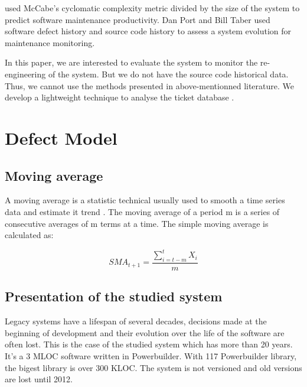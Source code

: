 \documentclass[10pt,conference]{IEEEtran}
\begin{document}

 \cite{gill91} used McCabe’s cyclomatic complexity metric divided by the size of the system to predict software maintenance productivity.
Dan Port and Bill Taber \cite{port18,Zhan10a} used software defect history and source code history to assess a system evolution for maintenance monitoring. 

In this paper, we are interested to evaluate the system to monitor the re-engineering of the system. But we do not have the source code historical data. Thus, we cannot use the methods presented in above-mentionned literature. We develop a lightweight technique to analyse the ticket database .

\section{Defect Model}
\label{sec:defectModel}

\subsection{Moving average}

A moving average is a statistic technical usually used to smooth a time series data and estimate it trend \cite{MOLU17}.
 The moving average of a period m is a series of consecutive averages of m terms at a time. 
 The simple moving average is calculated as:

\begin{equation}
SMA_{t+1}=\frac{\sum\limits_{i=t-m}^t X_i}{m}
\end{equation}

\subsection{Presentation of the studied system}
Legacy systems have a lifespan of several decades, decisions made at the beginning of development and their evolution over the life of the software are often lost. 
This is the case of the studied system  which has more than 20 years. 
It's a 3 MLOC software written in Powerbuilder. With 117 Powerbuilder library, the  bigest library is  over 300 KLOC.
The system is not versioned and old versions are lost until 2012.
\end{document}

